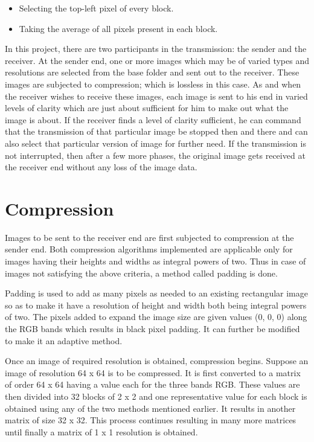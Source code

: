 \documentclass[twocolumn,12pt]{article}
\begin{document}
\begin{itemize}
\item Selecting the top-left pixel of every block.
\item Taking the average of all pixels present in each block.
\end{itemize}

In this project, there are two participants in the transmission: the sender and the receiver. At the sender end, one or more images which may be of varied types and resolutions are selected from the base folder and sent out to the receiver. These images are subjected to compression; which is lossless in this case. As and when the receiver wishes to receive these images, each image is sent to his end in varied levels of clarity which are just about sufficient for him to make out what the image is about. If the receiver finds a level of clarity sufficient, he can command that the transmission of that particular image be stopped then and there and can also select that particular version of image for further need. If the transmission is not interrupted, then after a few more phases, the original image gets received at the receiver end without any loss of the image data. 

\section{Compression}
Images to be sent to the receiver end are first subjected to compression at the sender end. Both compression algorithms implemented are applicable only for images having their heights and widths as integral powers of two. Thus in case of images not satisfying the above criteria, a method called padding is done.

Padding is used to add as many pixels as needed to an existing rectangular image so as to make it have a resolution of height and width both being integral powers of two. The pixels added to expand the image size are given values (0, 0, 0) along the RGB bands which results in black pixel padding. It can further be modified to make it an adaptive method.

Once an image of required resolution is obtained, compression begins. Suppose an image of resolution 64 x 64 is to be compressed. It is first converted to a matrix of order 64 x 64 having a value each for the three bands RGB. These values are then divided into 32 blocks of 2 x 2 and one representative value for each block is obtained using any of the two methods mentioned earlier. It results in another matrix of size 32 x 32. This process continues resulting in many more matrices until finally a matrix of 1 x 1 resolution is obtained.
	
\end{document}
